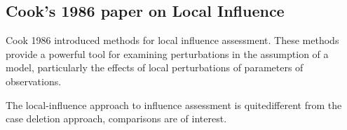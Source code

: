 \documentclass[Main.tex]{subfiles}
\begin{document}

\subsection{Cook's 1986 paper on Local Influence}%
Cook 1986 introduced methods for local influence assessment. These methods provide a powerful tool for examining perturbations in the assumption of a model, particularly the effects of local perturbations of parameters of observations.

The local-influence approach to influence assessment is quitedifferent from the case deletion approach, comparisons are of
interest.
\end{document}
